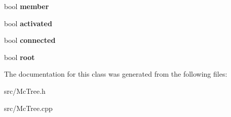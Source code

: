\begin{DoxyCompactItemize}
\item 
\hypertarget{classMcTree_a0ac20f71cbb9a85d56ee3224baaa828c}{bool {\bfseries member}}\label{classMcTree_a0ac20f71cbb9a85d56ee3224baaa828c}

\item 
\hypertarget{classMcTree_ae71202567a76e8f7c5090e6d88b9f7bb}{bool {\bfseries activated}}\label{classMcTree_ae71202567a76e8f7c5090e6d88b9f7bb}

\item 
\hypertarget{classMcTree_a95aed3d5f4b4462d9eefe395aae682f6}{bool {\bfseries connected}}\label{classMcTree_a95aed3d5f4b4462d9eefe395aae682f6}

\item 
\hypertarget{classMcTree_aca22645aa04356858acb0a8c7aae5b8c}{bool {\bfseries root}}\label{classMcTree_aca22645aa04356858acb0a8c7aae5b8c}

\end{DoxyCompactItemize}


The documentation for this class was generated from the following files\-:\begin{DoxyCompactItemize}
\item 
src/Mc\-Tree.\-h\item 
src/Mc\-Tree.\-cpp\end{DoxyCompactItemize}

